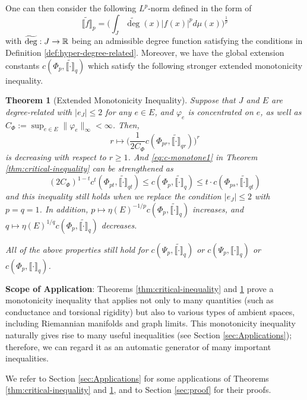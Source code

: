 \documentclass[12pt,a4paper]{article}
\newtheorem{theorem}{Theorem}[section]
\begin{document}
One can then consider the following $L^p$-norm defined in the form of $$\widetilde{\big\llbracket   f\big\rrbracket}_p=\Big(\int_J\widetilde{\deg}(x)|f(x)|^pd\mu(x)\Big)^{\frac1p}$$ 
with $\widetilde{\deg}:J\to \mathbb{R}$ being an admissible degree function satisfying the conditions in Definition \ref{def:hyper-degree-related}. 
Moreover, we have the global extension constants $c(\Phi_p,\widetilde{\llbracket \cdot\rrbracket}_{q})$ which satisfy the following stronger extended monotonicity inequality.
\begin{theorem}[Extended Monotonicity Inequality]\label{thm:critical-inequality2}
Suppose that $J$ and $E$ are degree-related with $|e_J|\le 2$ for any $e\in E$, and $\varphi_e$ is concentrated on $e$, as well as $C_\Phi:=\sup_{e\in E}\|\varphi_e\|_\infty<\infty$.  
Then, $$r\mapsto \big(\frac{1}{2C_\Phi}c(\Phi_{pr},\widetilde{\llbracket \cdot\rrbracket}_{qr})\big)^r$$ is decreasing with respect to $r\ge 1$. And \eqref{eq:c-monotone1} in Theorem \ref{thm:critical-inequality} can be strengthened as%
$$(2C_\Phi)^{1-t}c^t(\Phi_{pt},\widetilde{\llbracket \cdot\rrbracket}_{qt})\le c(\Phi_p,\widetilde{\llbracket \cdot\rrbracket}_{q})\le t\cdot  c(\Phi_{ps},\widetilde{\llbracket \cdot\rrbracket}_{qt}) $$
and this inequality still holds when we replace the condition $|e_J|\le2$ with $p=q=1$. 
In addition, $p\mapsto \eta(E)^{-1/p}c(\Phi_p,\widetilde{\llbracket \cdot\rrbracket}_{q})$ increases, and $q\mapsto \eta(E)^{1/q}c(\Phi_p,\widetilde{\llbracket \cdot\rrbracket}_{q})$ decreases.  

All of the above properties still hold for $c(\Psi_p,\widetilde{\llbracket \cdot\rrbracket}_{q})$ or  $c(\Psi_p,\llbracket \cdot\rrbracket_{q})$ or  $c(\Phi_p,\llbracket \cdot\rrbracket_{q})$. 
\end{theorem}


\noindent\textbf{Scope of Application}: 
Theorems \ref{thm:critical-inequality} and \ref{thm:critical-inequality2} prove a monotonicity inequality that applies not only to many quantities (such as conductance and torsional rigidity) but also to various types of ambient spaces, including Riemannian manifolds and graph limits. 
This monotonicity inequality naturally gives rise to many useful inequalities (see Section \ref{sec:Applications}); therefore, we can regard it as an automatic generator of many important inequalities.

We refer to Section \ref{sec:Applications} %
for some applications of Theorems \ref{thm:critical-inequality} and \ref{thm:critical-inequality2}, and to Section \ref{sec:proof} for their proofs.
\end{document}

